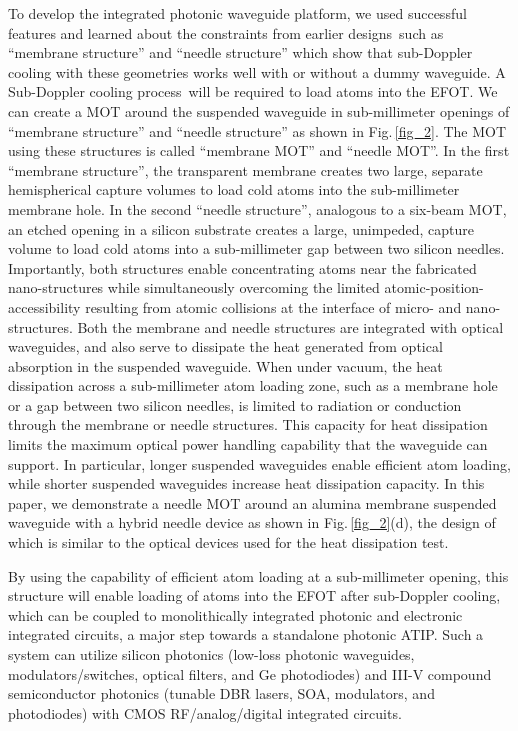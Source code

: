 \documentclass{osa-article}
\begin{document}
To develop the integrated photonic waveguide platform, we used successful features and learned about the constraints from earlier designs\,\cite{Lee20, Jau17} such as ``membrane structure'' and ``needle structure'' which show that sub-Doppler cooling with these geometries works well with or without a dummy waveguide. A Sub-Doppler cooling process\,\cite{Dalibard89, Chu89, Metcalf90, Phillips92, Foot92, Hinds11} will be required to load atoms into the EFOT. We can create a MOT around the suspended waveguide in sub-millimeter openings of ``membrane structure'' and ``needle structure'' as shown in Fig.\,\ref{fig_2}. The MOT using these structures is called ``membrane MOT'' and ``needle MOT''. In the first ``membrane structure'', the transparent membrane creates two large, separate hemispherical capture volumes to load cold atoms into the sub-millimeter membrane hole. In the second ``needle structure'', analogous to a six-beam MOT, an etched opening in a silicon substrate creates a large, unimpeded, capture volume to load cold atoms into a sub-millimeter gap between two silicon needles. Importantly, both structures enable concentrating atoms near the fabricated nano-structures while simultaneously overcoming the limited atomic-position-accessibility resulting from atomic collisions at the interface of micro- and nano-structures. Both the membrane and needle structures are integrated with optical waveguides, and also serve to dissipate the heat generated from optical absorption in the suspended waveguide. When under vacuum, the heat dissipation across a sub-millimeter atom loading zone, such as a membrane hole or a gap between two silicon needles, is limited to radiation or conduction through the membrane or needle structures. This capacity for heat dissipation limits the maximum optical power handling capability that the waveguide can support. In particular, longer suspended waveguides enable efficient atom loading, while shorter suspended waveguides increase heat dissipation capacity. In this paper, we demonstrate a needle MOT around an alumina membrane suspended waveguide with a hybrid needle device as shown in Fig.\,\ref{fig_2}(d), the design of which is similar to the optical devices used for the heat dissipation test.

By using the capability of efficient atom loading at a sub-millimeter opening, this structure will enable loading of atoms into the EFOT after sub-Doppler cooling, which can be coupled to monolithically integrated photonic and electronic integrated circuits, a major step towards a standalone photonic ATIP. Such a system can utilize silicon photonics (low-loss photonic waveguides, modulators/switches, optical filters, and Ge photodiodes) and III-V compound semiconductor photonics (tunable DBR lasers, SOA, modulators, and photodiodes) with CMOS RF/analog/digital integrated circuits.
\end{document}

